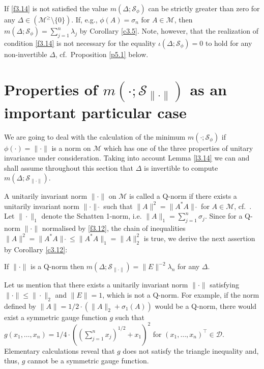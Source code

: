 \documentclass{amsart}
\begin{document}
If \eqref{f3.14} is not satisfied the value $m(\Delta ; {\mathcal S}_\phi )$ can be strictly greater than zero for any $\Delta \in ({\mathcal M}^\geq \setminus \{ 0 \} )$.  If, e.g., $\phi(A)=\sigma_n$ for $A \in \mathcal M$, then $m(\Delta ; {\mathcal S}_\phi ) = \sum_{j=1}^n \lambda_j$ by Corollary \ref{c3.5}. Note, however, that the realization of condition \eqref{f3.14} is not necessary for the equality $\iota(\Delta ; {\mathcal S}_\phi ) = 0$ to hold for any non-invertible $\Delta$, cf.~Proposition \ref{p5.1} below.


\section{Properties of $m( \cdot ; {\mathcal S}_{\| \cdot \|})$ as an important particular case }
\label{s4}

We are going to deal with the calculation of the minimum $m( \cdot ; {\mathcal S}_\phi)$ if $\phi( \cdot ) = \| \cdot \|$ is a norm on $\mathcal M$ which has one of the three properties of unitary invariance under consideration. Taking into account Lemma \ref{l3.14} we can and shall assume throughout this section that $\Delta$ is invertible to compute $m( \Delta ; {\mathcal S}_{\| \cdot \|})$.

A unitarily invariant norm $\| \cdot \|$ on $\mathcal M$ is called a Q-norm if there exists a unitarily invariant norm $\| \cdot \| \widehat{\,\,}$ such that $\| A \|^2=\| A^*A \| \widehat{\,\,}$ for $A \in \mathcal M$, cf.~\cite[Def.~IV.2.9]{Bh}. Let $\| \cdot \|_1$ denote the Schatten 1-norm, i.e. $\| A \|_1 = \sum_{j=1}^n \sigma_j$. Since for a Q-norm $\| \cdot \|$ normalised by \eqref{f3.12}, the chain of inequalities $\| A \|^2 = \| A^*A \| \widehat{\,\,} \leq \| A^*A \|_1 = \| A \|_2^2$ is true, we derive the next assertion by Corollary \ref{c3.12}: 

\begin{pro} \label{p4.1}
If $\| \cdot \|$ is a Q-norm then $m( \Delta ; {\mathcal S}_{\| \cdot \|}) = \| E \|^{-2} \lambda_n$ for any $\Delta$. 
\end{pro}

Let us mention that there exists a unitarily invariant norm  $\| \cdot \|$ satisfying $\| \cdot \| \leq \| \cdot \|_2$ and $\| E \| = 1$, which is not a Q-norm. For example, if the norm defined by $\| A \| = 1/2 \cdot (\| A \|_2 + \sigma_1(A))$ would be a Q-norm, there would exist a symmetric gauge function $g$ such that $g(x_1,\ldots,x_n)=1/4 \cdot ((\sum_{j=1}^n x_j)^{1/2} + x_1)^2$ for $(x_1,\ldots,x_n)^\top \in \mathcal D$. Elementary calculations reveal that $g$ does not satisfy the triangle inequality and, thus, $g$ cannot be a symmetric gauge function. 
\end{document}
